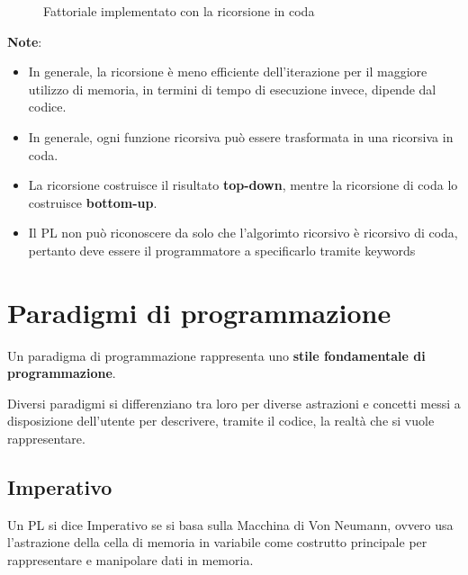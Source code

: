 \documentclass[12pt,a4paper]{article}
\begin{document}
\begin{figure}[h!]
	\begin{center}
	  \caption{Fattoriale implementato con la ricorsione in coda}
	\end{center}
\end{figure}

\textbf{Note}:
\begin{itemize}
\item In generale, la ricorsione è meno efficiente dell'iterazione per il maggiore utilizzo di memoria, in termini di tempo di esecuzione invece, dipende dal codice.
\item In generale, ogni funzione ricorsiva può essere trasformata in una ricorsiva in coda.
\item La ricorsione costruisce il risultato \textbf{top-down}, mentre la ricorsione di coda lo costruisce \textbf{bottom-up}.
\item Il PL non può riconoscere da solo che l'algorimto ricorsivo è ricorsivo di coda, pertanto deve essere il programmatore a specificarlo tramite keywords
\end{itemize}

\section{Paradigmi di programmazione}
Un paradigma di programmazione rappresenta uno \textbf{stile fondamentale di programmazione}.

Diversi paradigmi si differenziano tra loro per diverse astrazioni e concetti messi a disposizione dell'utente per descrivere, tramite il codice, la realtà che si vuole rappresentare.

\subsection{Imperativo}
Un PL si dice Imperativo se si basa sulla Macchina di Von Neumann, ovvero usa l'astrazione della cella di memoria in variabile come costrutto principale per rappresentare e manipolare dati in memoria.
\end{document}
